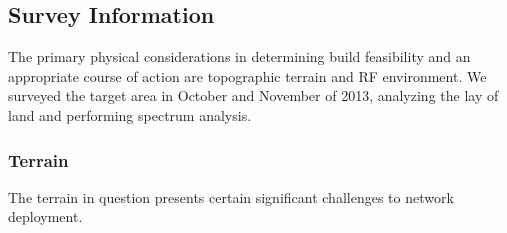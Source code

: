\subsection{Survey Information}
The primary physical considerations in determining build feasibility and an
appropriate course of action are topographic terrain and RF environment. We
surveyed the target area in October and November of 2013, analyzing the lay of land
and performing spectrum analysis. \par
\subsubsection{Terrain}
The terrain in question presents certain significant challenges to network
deployment. 
\begin{center}
\end{center}
